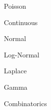 \documentclass[11pt]{article}
\begin{document}
\begin{enumerate}
\begin{item}
\begin{enumerate}
\begin{item}
\begin{enumerate}
\begin{item}
\begin{enumerate}
                      \begin{item}
                        Poisson
                      \end{item}

                  \end{enumerate}

                \end{item}

                \begin{item}

                  Continuous

                  \begin{enumerate}

                      \begin{item}
                        Normal
                      \end{item}

                      \begin{item}
                        Log-Normal
                      \end{item}

                      \begin{item}
                        Laplace
                      \end{item}

                      \begin{item}
                        Gamma
                      \end{item}

                  \end{enumerate}

                \end{item}

            \end{enumerate}

          \end{item}

          \begin{item}
            Combinatorics
          \end{item}

      \end{enumerate}

    \end{item}

\end{enumerate}
\end{document}
